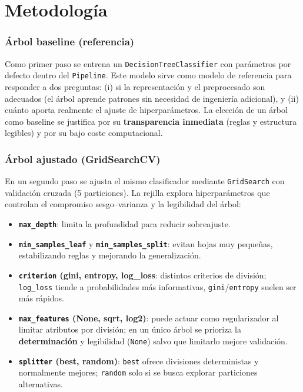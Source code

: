 \section{Metodología}

\subsubsection{Árbol baseline (referencia)}
Como primer paso se entrena un \texttt{DecisionTreeClassifier} con parámetros por defecto dentro del \texttt{Pipeline}. Este modelo sirve como modelo de referencia para responder a dos preguntas: (i) si la representación y el preprocesado son adecuados (el árbol aprende patrones sin necesidad de ingeniería adicional), y (ii) cuánto aporta realmente el ajuste de hiperparámetros. La elección de un árbol como baseline se justifica por su \textbf{transparencia inmediata} (reglas y estructura legibles) y por su bajo coste computacional.

\subsubsection{Árbol ajustado (GridSearchCV)}
En un segundo paso se ajusta el mismo clasificador mediante \texttt{GridSearch} con validación cruzada (5 particiones). La rejilla explora hiperparámetros que controlan el compromiso sesgo–varianza y la legibilidad del árbol:

\begin{itemize}
  \item \textbf{\texttt{max\_depth}}: limita la profundidad para reducir sobreajuste.
  \item \textbf{\texttt{min\_samples\_leaf}} y \textbf{\texttt{min\_samples\_split}}: evitan hojas muy pequeñas, estabilizando reglas y mejorando la generalización.
  \item \textbf{\texttt{criterion} (gini, entropy, log\_loss}: distintos criterios de división; \texttt{log\_loss} tiende a probabilidades más informativas, \texttt{gini}/\texttt{entropy} suelen ser más rápidos.
  \item \textbf{\texttt{max\_features} (None, sqrt, log2)}: puede actuar como regularizador al limitar atributos por división; en un único árbol se prioriza la \textbf{determinación} y legibilidad (\texttt{None}) salvo que limitarlo mejore validación.
  \item \textbf{\texttt{splitter} (best, random)}: \texttt{best} ofrece divisiones deterministas y normalmente mejores; \texttt{random} solo si se busca explorar particiones alternativas.
\end{itemize}

